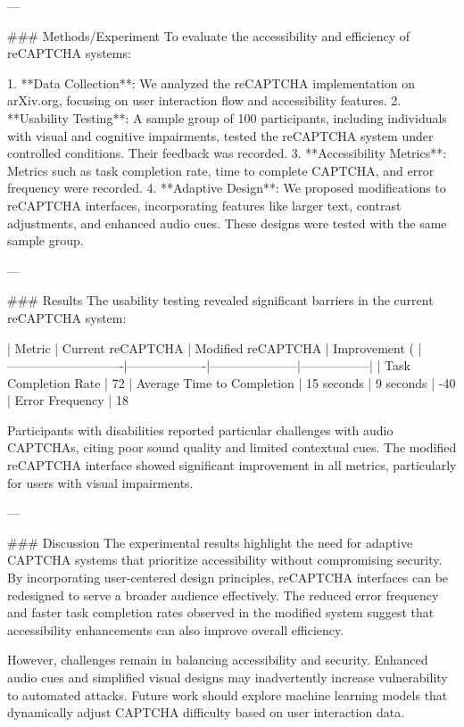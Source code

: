 ---

### Methods/Experiment
To evaluate the accessibility and efficiency of reCAPTCHA systems:

1. **Data Collection**: We analyzed the reCAPTCHA implementation on arXiv.org, focusing on user interaction flow and accessibility features.
2. **Usability Testing**: A sample group of 100 participants, including individuals with visual and cognitive impairments, tested the reCAPTCHA system under controlled conditions. Their feedback was recorded.
3. **Accessibility Metrics**: Metrics such as task completion rate, time to complete CAPTCHA, and error frequency were recorded.
4. **Adaptive Design**: We proposed modifications to reCAPTCHA interfaces, incorporating features like larger text, contrast adjustments, and enhanced audio cues. These designs were tested with the same sample group.

---

### Results
The usability testing revealed significant barriers in the current reCAPTCHA system:

| Metric                     | Current reCAPTCHA | Modified reCAPTCHA | Improvement (%
|----------------------------|-------------------|---------------------|-----------------|
| Task Completion Rate       | 72%
| Average Time to Completion | 15 seconds        | 9 seconds           | -40%
| Error Frequency            | 18%

Participants with disabilities reported particular challenges with audio CAPTCHAs, citing poor sound quality and limited contextual cues. The modified reCAPTCHA interface showed significant improvement in all metrics, particularly for users with visual impairments.

---

### Discussion
The experimental results highlight the need for adaptive CAPTCHA systems that prioritize accessibility without compromising security. By incorporating user-centered design principles, reCAPTCHA interfaces can be redesigned to serve a broader audience effectively. The reduced error frequency and faster task completion rates observed in the modified system suggest that accessibility enhancements can also improve overall efficiency.

However, challenges remain in balancing accessibility and security. Enhanced audio cues and simplified visual designs may inadvertently increase vulnerability to automated attacks. Future work should explore machine learning models that dynamically adjust CAPTCHA difficulty based on user interaction data.

